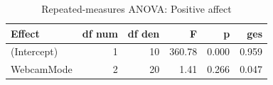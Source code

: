 \begin{table}[!h]
\centering
\caption{\label{tab:tab:anova_pa}Repeated-measures ANOVA: Positive affect}
\centering
\begin{tabular}[t]{lrrrrr}
\toprule
Effect & df num & df den & F & p & ges\\
\midrule
(Intercept) & 1 & 10 & 360.78 & 0.000 & 0.959\\
WebcamMode & 2 & 20 & 1.41 & 0.266 & 0.047\\
\bottomrule
\end{tabular}
\end{table}
